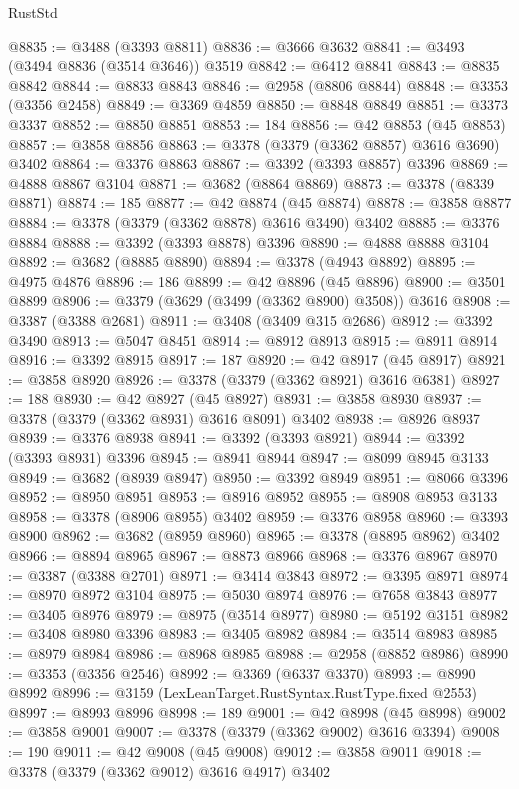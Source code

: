 \begin{lexlean}{RustStd}
\begin{coremodule}
@8835 := @3488 (@3393 @8811)
@8836 := @3666 @3632
@8841 := @3493 (@3494 @8836 (@3514 @3646)) @3519
@8842 := @6412 @8841
@8843 := @8835 @8842
@8844 := @8833 @8843
@8846 := @2958 (@8806 @8844)
@8848 := @3353 (@3356 @2458)
@8849 := @3369 @4859
@8850 := @8848 @8849
@8851 := @3373 @3337
@8852 := @8850 @8851
@8853 := 184
@8856 := @42 @8853 (@45 @8853)
@8857 := @3858 @8856
@8863 := @3378 (@3379 (@3362 @8857) @3616 @3690) @3402
@8864 := @3376 @8863
@8867 := @3392 (@3393 @8857) @3396
@8869 := @4888 @8867 @3104
@8871 := @3682 (@8864 @8869)
@8873 := @3378 (@8339 @8871)
@8874 := 185
@8877 := @42 @8874 (@45 @8874)
@8878 := @3858 @8877
@8884 := @3378 (@3379 (@3362 @8878) @3616 @3490) @3402
@8885 := @3376 @8884
@8888 := @3392 (@3393 @8878) @3396
@8890 := @4888 @8888 @3104
@8892 := @3682 (@8885 @8890)
@8894 := @3378 (@4943 @8892)
@8895 := @4975 @4876
@8896 := 186
@8899 := @42 @8896 (@45 @8896)
@8900 := @3501 @8899
@8906 := @3379 (@3629 (@3499 (@3362 @8900) @3508)) @3616
@8908 := @3387 (@3388 @2681)
@8911 := @3408 (@3409 @315 @2686)
@8912 := @3392 @3490
@8913 := @5047 @8451
@8914 := @8912 @8913
@8915 := @8911 @8914
@8916 := @3392 @8915
@8917 := 187
@8920 := @42 @8917 (@45 @8917)
@8921 := @3858 @8920
@8926 := @3378 (@3379 (@3362 @8921) @3616 @6381)
@8927 := 188
@8930 := @42 @8927 (@45 @8927)
@8931 := @3858 @8930
@8937 := @3378 (@3379 (@3362 @8931) @3616 @8091) @3402
@8938 := @8926 @8937
@8939 := @3376 @8938
@8941 := @3392 (@3393 @8921)
@8944 := @3392 (@3393 @8931) @3396
@8945 := @8941 @8944
@8947 := @8099 @8945 @3133
@8949 := @3682 (@8939 @8947)
@8950 := @3392 @8949
@8951 := @8066 @3396
@8952 := @8950 @8951
@8953 := @8916 @8952
@8955 := @8908 @8953 @3133
@8958 := @3378 (@8906 @8955) @3402
@8959 := @3376 @8958
@8960 := @3393 @8900
@8962 := @3682 (@8959 @8960)
@8965 := @3378 (@8895 @8962) @3402
@8966 := @8894 @8965
@8967 := @8873 @8966
@8968 := @3376 @8967
@8970 := @3387 (@3388 @2701)
@8971 := @3414 @3843
@8972 := @3395 @8971
@8974 := @8970 @8972 @3104
@8975 := @5030 @8974
@8976 := @7658 @3843
@8977 := @3405 @8976
@8979 := @8975 (@3514 @8977)
@8980 := @5192 @3151
@8982 := @3408 @8980 @3396
@8983 := @3405 @8982
@8984 := @3514 @8983
@8985 := @8979 @8984
@8986 := @8968 @8985
@8988 := @2958 (@8852 @8986)
@8990 := @3353 (@3356 @2546)
@8992 := @3369 (@6337 @3370)
@8993 := @8990 @8992
@8996 := @3159 (LexLeanTarget.RustSyntax.RustType.fixed @2553)
@8997 := @8993 @8996
@8998 := 189
@9001 := @42 @8998 (@45 @8998)
@9002 := @3858 @9001
@9007 := @3378 (@3379 (@3362 @9002) @3616 @3394)
@9008 := 190
@9011 := @42 @9008 (@45 @9008)
@9012 := @3858 @9011
@9018 := @3378 (@3379 (@3362 @9012) @3616 @4917) @3402

\end{coremodule}
\end{lexlean}
